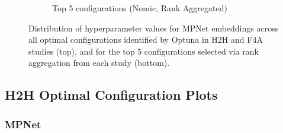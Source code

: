 \documentclass[10pt,oneside]{report}
\begin{document}
\begin{figure}[H]
\begin{subfigure}[b]{0.82\textwidth}
        \caption{Top 5 configurations (Nomic, Rank Aggregated)}
        \label{fig:nomic_param_plot_top5}
    \end{subfigure}
    \caption{Distribution of hyperparameter values for MPNet embeddings across all optimal configurations identified by Optuna in H2H and F4A studies (top), and for the top 5 configurations selected via rank aggregation from each study (bottom).}
    \label{fig:nomic_param}
\end{figure}

\subsection{H2H Optimal Configuration Plots}\label{sec:h2h_config_appendix}
\subsubsection{MPNet}
\end{document}
